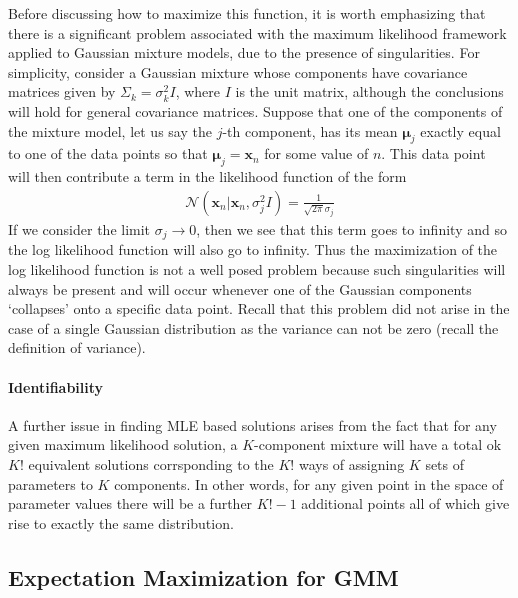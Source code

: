 Before discussing how to maximize this function, it is worth emphasizing that there is a significant problem associated with the maximum likelihood framework applied to Gaussian mixture models, due to the presence of singularities. For simplicity, consider a Gaussian mixture whose components have covariance matrices given by $\Sigma_k = \sigma^2_kI$, where $I$ is the unit matrix, although the conclusions will hold for general covariance matrices. Suppose that one of the components of the mixture model, let us say the $j$-th component, has its mean $\boldsymbol{\mu}_j$ exactly equal to one of the data points so that $\boldsymbol{\mu}_j = \mathbf{x}_n$ for some value of $n$. This data point will then contribute a term in the likelihood function of the form
\begin{align*}
	\mathcal{N}(\mathbf{x}_n|\mathbf{x}_n, \sigma^2_jI) = \frac{1}{\sqrt{2\pi}\sigma_j}
\end{align*}
If we consider the limit $\sigma_j \to 0$, then we see that this term goes to infinity and so the log likelihood function will also go to infinity. Thus the maximization of the log likelihood function is not a well posed problem because such singularities will always be present and will occur whenever one of the Gaussian components `collapses' onto a specific data point. Recall that this problem did not arise in the case of a single Gaussian distribution as the variance can not be zero (recall the definition of variance). 


\paragraph{Identifiability}
A further issue in finding MLE based solutions arises from the fact that for any given maximum likelihood solution, a $K$-component mixture will have a total ok $K!$ equivalent solutions corrsponding to the $K!$ ways of assigning $K$ sets of parameters to $K$ components. In other words, for any given point in the space of parameter values there will be a further $K!-1$ additional points all of which give rise to exactly the same distribution. 

\subsection{Expectation Maximization for GMM}


